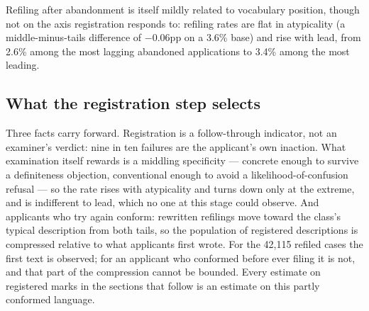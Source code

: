 Refiling after abandonment is itself mildly related to vocabulary
position, though not on the axis registration responds to: refiling rates
are flat in atypicality (a middle-minus-tails difference of $-0.06$pp on a
3.6\% base) and rise with lead, from 2.6\% among the most lagging
abandoned applications to 3.4\% among the most leading.

\subsection{What the registration step selects}\label{sec:reg_conclusion}

Three facts carry forward. Registration is a follow-through indicator, not
an examiner's verdict: nine in ten failures are the applicant's own
inaction. What examination itself rewards is a middling specificity ---
concrete enough to survive a definiteness objection, conventional enough
to avoid a likelihood-of-confusion refusal --- so the rate rises with
atypicality and turns down only at the extreme, and is indifferent to
lead, which no one at this stage could observe. And applicants who try
again conform: rewritten refilings move toward the class's typical
description from both tails, so the population of registered descriptions
is compressed relative to what applicants first wrote. For the 42{,}115
refiled cases the first text is observed; for an applicant who conformed
before ever filing it is not, and that part of the compression cannot be
bounded. Every estimate on registered marks in the sections that follow is
an estimate on this partly conformed language.
